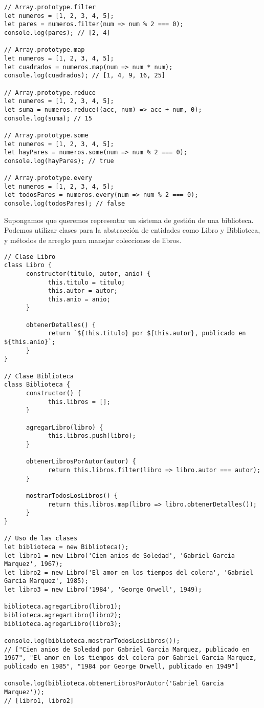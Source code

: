 \documentclass{article}
\begin{document}
\begin{lstlisting}
// Array.prototype.filter
let numeros = [1, 2, 3, 4, 5];
let pares = numeros.filter(num => num % 2 === 0);
console.log(pares); // [2, 4]

// Array.prototype.map
let numeros = [1, 2, 3, 4, 5];
let cuadrados = numeros.map(num => num * num);
console.log(cuadrados); // [1, 4, 9, 16, 25]

// Array.prototype.reduce
let numeros = [1, 2, 3, 4, 5];
let suma = numeros.reduce((acc, num) => acc + num, 0);
console.log(suma); // 15

// Array.prototype.some
let numeros = [1, 2, 3, 4, 5];
let hayPares = numeros.some(num => num % 2 === 0);
console.log(hayPares); // true

// Array.prototype.every
let numeros = [1, 2, 3, 4, 5];
let todosPares = numeros.every(num => num % 2 === 0);
console.log(todosPares); // false
\end{lstlisting}

Supongamos que queremos representar un sistema de gestión de una 
biblioteca. Podemos utilizar clases para la abstracción de entidades como 
Libro y Biblioteca, y métodos de arreglo para manejar colecciones de libros.

\begin{lstlisting}
// Clase Libro
class Libro {
      constructor(titulo, autor, anio) {
            this.titulo = titulo;
            this.autor = autor;
            this.anio = anio;
      }

      obtenerDetalles() {
            return `${this.titulo} por ${this.autor}, publicado en ${this.anio}`;
      }
}

// Clase Biblioteca
class Biblioteca {
      constructor() {
            this.libros = [];
      }

      agregarLibro(libro) {
            this.libros.push(libro);
      }

      obtenerLibrosPorAutor(autor) {
            return this.libros.filter(libro => libro.autor === autor);
      }

      mostrarTodosLosLibros() {
            return this.libros.map(libro => libro.obtenerDetalles());
      }
}

// Uso de las clases
let biblioteca = new Biblioteca();
let libro1 = new Libro('Cien anios de Soledad', 'Gabriel Garcia Marquez', 1967);
let libro2 = new Libro('El amor en los tiempos del colera', 'Gabriel Garcia Marquez', 1985);
let libro3 = new Libro('1984', 'George Orwell', 1949);

biblioteca.agregarLibro(libro1);
biblioteca.agregarLibro(libro2);
biblioteca.agregarLibro(libro3);

console.log(biblioteca.mostrarTodosLosLibros());
// ["Cien anios de Soledad por Gabriel Garcia Marquez, publicado en 1967", "El amor en los tiempos del colera por Gabriel Garcia Marquez, publicado en 1985", "1984 por George Orwell, publicado en 1949"]

console.log(biblioteca.obtenerLibrosPorAutor('Gabriel Garcia Marquez'));
// [libro1, libro2]
      
\end{lstlisting}
\end{document}
